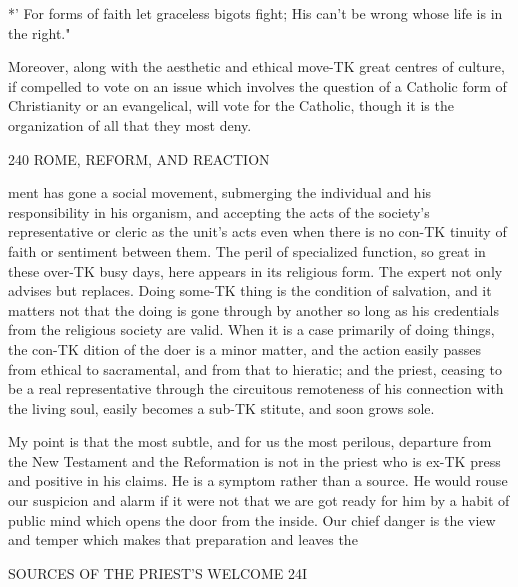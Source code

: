 \documentclass[12pt,a5paper,twoside]{book}
\begin{document}
{*' For forms of faith let graceless bigots fight; 
His can't be wrong whose life is in the right." 

Moreover, along with the aesthetic and ethical move-TK
great centres of culture, if compelled to vote on an issue which 
involves the question of a Catholic form of Christianity or an 
evangelical, will vote for the Catholic, though it is the organization 
of all that they most deny. 



240 ROME, REFORM, AND REACTION 

ment has gone a social movement, submerging the 
individual and his responsibility in his organism, and 
accepting the acts of the society's representative or 
cleric as the unit's acts even when there is no con-TK
tinuity of faith or sentiment between them. The 
peril of specialized function, so great in these over-TK
busy days, here appears in its religious form. The 
expert not only advises but replaces. Doing some-TK
thing is the condition of salvation, and it matters not 
that the doing is gone through by another so long as 
his credentials from the religious society are valid. 
When it is a case primarily of doing things, the con-TK
dition of the doer is a minor matter, and the action 
easily passes from ethical to sacramental, and from 
that to hieratic; and the priest, ceasing to be a real 
representative through the circuitous remoteness of his 
connection with the living soul, easily becomes a sub-TK
stitute, and soon grows sole. 

My point is that the most subtle, and for us the 
most perilous, departure from the New Testament 
and the Reformation is not in the priest who is ex-TK
press and positive in his claims. He is a symptom 
rather than a source. He would rouse our suspicion 
and alarm if it were not that we are got ready for 
him by a habit of public mind which opens the door 
from the inside. Our chief danger is the view and 
temper which makes that preparation and leaves the 



SOURCES OF THE PRIEST'S WELCOME 24I 

}
\end{document}
